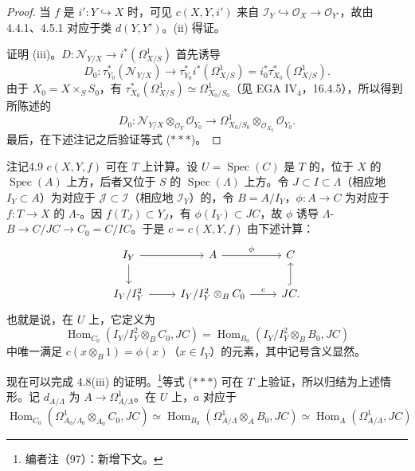 \begin{proof}
当 $f$ 是 $i':Y\hookrightarrow X$ 时，可见 $c(X,Y,i')$ 来自 $\mathscr I_Y\hookrightarrow\mathscr O_X\to\mathscr O_{Y'}$，故由 4.4.1、4.5.1 对应于类 $d(Y,Y')$。(ii) 得证。

证明 (iii)。$D:\mathscr N_{Y/X}\to i^*(\Omega^1_{X/S})$ 首先诱导
\[D_0:\tau_{Y_0}^*(\mathscr N_{Y/X})\longrightarrow\tau_{Y_0}^*i^*(\Omega^1_{X/S})=i_0^*\tau_{X_0}^*(\Omega^1_{X/S}).\]
由于 $X_0=X\times_S S_0$，有 $\tau_{X_0}^*(\Omega^1_{X/S})\simeq\Omega^1_{X_0/S_0}$（见 EGA IV$_4$，16.4.5），所以得到所陈述的
\[D_0:\mathscr N_{Y/X}\otimes_{\mathscr O_Y}\mathscr O_{Y_0}\longrightarrow\Omega^1_{X_0/S_0}\otimes_{\mathscr O_{X_0}}\mathscr O_{Y_0}.\]
最后，在下述注记之后验证等式 ($***$)。
\end{proof}
\begin{SGAresult}{注记}{4.9}
 $c(X,Y,f)$ 可在 $T$ 上计算。设 $U=\operatorname{Spec}(C)$ 是 $T$ 的，位于 $X$ 的 $\operatorname{Spec}(A)$ 上方，后者又位于 $S$ 的 $\operatorname{Spec}(\Lambda)$ 上方。令 $J\subset I\subset\Lambda$（相应地 $I_Y\subset A$）为对应于 $\mathscr J\subset\mathscr I$（相应地 $\mathscr I_Y$）的，令 $B=A/I_Y$，$\phi:A\to C$ 为对应于 $f:T\to X$ 的 $\Lambda$-。因 $f(T_J)\subset Y_J$，有 $\phi(I_Y)\subset JC$，故 $\phi$ 诱导 $\Lambda$- $B\to C/JC\to C_0=C/IC$。于是 $c=c(X,Y,f)$ 由下述计算：
\[
\begin{tikzcd}
I_Y\arrow[r]\arrow[d]&A\arrow[r,"\phi"]&C\\
I_Y/I_Y^2\arrow[r]&I_Y/I_Y^2\otimes_B C_0\arrow[r,"c"]&JC\arrow[u,hook].
\end{tikzcd}
\]
也就是说，在 $U$ 上，它定义为
\[\operatorname{Hom}_{C_0}(I_Y/I_Y^2\otimes_B C_0,JC)=\operatorname{Hom}_{B_0}(I_Y/I_Y^2\otimes_B B_0,JC)\]
中唯一满足 $c(x\otimes_B1)=\phi(x)$（$x\in I_Y$）的元素，其中记号含义显然。
\end{SGAresult}
现在可以完成 4.8(iii) 的证明。\footnote{编者注（97）：新增下文。}等式 ($***$) 可在 $T$ 上验证，所以归结为上述情形。记 $d_{A/\Lambda}$ 为 $A\to\Omega^1_{A/\Lambda}$。在 $U$ 上，$a$ 对应于
\[\operatorname{Hom}_{C_0}(\Omega^1_{A_0/\Lambda_0}\otimes_{A_0}C_0,JC)\simeq\operatorname{Hom}_{B_0}(\Omega^1_{A/\Lambda}\otimes_A B_0,JC)\simeq\operatorname{Hom}_A(\Omega^1_{A/\Lambda},JC)\]
